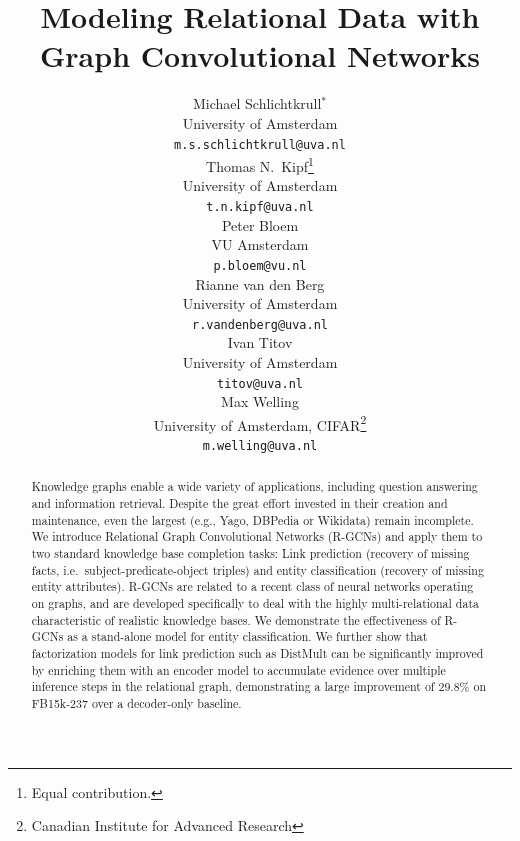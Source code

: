 \documentclass[letterpaper]{article} %
\begin{document}
\title{Modeling Relational Data with Graph Convolutional Networks}

\author{
  Michael Schlichtkrull$^*$\\
  University of Amsterdam\\
  \texttt{m.s.schlichtkrull@uva.nl}\\\And
  Thomas N.~Kipf\thanks{Equal contribution.}\\
  University of Amsterdam\\
  \texttt{t.n.kipf@uva.nl}\\ \And
   Peter Bloem\\
  VU Amsterdam\\
  \texttt{p.bloem@vu.nl}\\ \AND
  Rianne van den Berg\\
  University of Amsterdam\\
  \texttt{r.vandenberg@uva.nl}\\\And
  Ivan Titov\\
  University of Amsterdam\\
  \texttt{titov@uva.nl}\\ \And
  Max Welling\\
  University of Amsterdam, CIFAR\thanks{Canadian Institute for Advanced Research}\\
  \texttt{m.welling@uva.nl}\\
}

\maketitle

\begin{abstract}

Knowledge graphs enable a wide variety of applications, including question answering and information retrieval. Despite the great effort invested in their creation and maintenance, even the largest (e.g., Yago, DBPedia or Wikidata) remain incomplete. We introduce Relational Graph Convolutional Networks (R-GCNs) and apply them to two standard knowledge base completion tasks: Link prediction (recovery of missing facts, i.e.~subject-predicate-object triples) and entity classification (recovery of missing entity attributes). R-GCNs are related to a recent class of neural networks operating on graphs, and are developed specifically to deal with the highly multi-relational data characteristic of realistic knowledge bases. We demonstrate the effectiveness of R-GCNs as a stand-alone model for entity classification. We further show that factorization models for link prediction such as DistMult can be significantly improved by enriching them with an encoder model to accumulate evidence over multiple inference steps in the relational graph, demonstrating a large improvement of 29.8\% on FB15k-237 over a decoder-only baseline.

\end{abstract}
\end{document}
